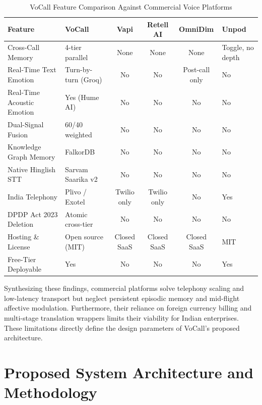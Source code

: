 \documentclass[12pt,a4paper]{article}
\begin{document}
\begin{table}[H]
\centering
\caption{VoCall Feature Comparison Against Commercial Voice Platforms}
\label{tab:platform_compare}
\footnotesize
\begin{tabularx}{\textwidth}{@{}p{4.3cm} p{3.1cm} c c c X@{}}
\toprule
\textbf{Feature} & \textbf{VoCall} & \textbf{Vapi} & \textbf{Retell AI} & \textbf{OmniDim} & \textbf{Unpod} \\
\midrule
Cross-Call Memory & 4-tier parallel & None & None & None & Toggle, no depth \\
Real-Time Text Emotion & Turn-by-turn (Groq) & No & No & Post-call only & No \\
Real-Time Acoustic Emotion & Yes (Hume AI) & No & No & No & No \\
Dual-Signal Fusion & 60/40 weighted & No & No & No & No \\
Knowledge Graph Memory & FalkorDB & No & No & No & No \\
Native Hinglish STT & Sarvam Saarika v2 & No & No & No & No \\
India Telephony & Plivo / Exotel & Twilio only & Twilio only & No & Yes \\
DPDP Act 2023 Deletion & Atomic cross-tier & No & No & No & No \\
Hosting \& License & Open source (MIT) & Closed SaaS & Closed SaaS & Closed SaaS & MIT \\
Free-Tier Deployable & Yes & No & No & No & Yes \\
\bottomrule
\end{tabularx}
\end{table}

Synthesizing these findings, commercial platforms solve telephony scaling and low-latency transport but neglect persistent episodic memory and mid-flight affective modulation. Furthermore, their reliance on foreign currency billing and multi-stage translation wrappers limits their viability for Indian enterprises. These limitations directly define the design parameters of VoCall's proposed architecture.

\section{Proposed System Architecture and Methodology}
\end{document}
